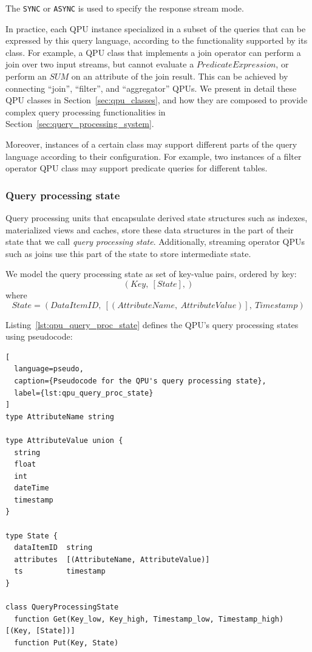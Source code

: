 The \texttt{SYNC} or \texttt{ASYNC} is used to specify the response stream mode.

In practice, each QPU instance specialized in a subset of the queries that can be expressed by this query language,
according to the functionality supported by its class.
For example, a QPU class that implements a join operator can perform a join over two input streams,
but cannot evaluate a $PredicateExpression$, or perform an $SUM$ on an attribute of the join result.
This can be achieved by connecting ``join'', ``filter'', and ``aggregator'' QPUs.
We present in detail these QPU classes in Section~\ref{sec:qpu_classes},
and how they are composed to provide complex query processing functionalities in Section~\ref{sec:query_processing_system}.

Moreover, instances of a certain class may support different parts of the query language according to their
configuration.
For example, two instances of a filter operator QPU class may support predicate queries for different tables.

\subsubsection{Query processing state}

Query processing units that encapsulate derived state structures such as indexes, materialized views and
caches, store these data structures in the part of their state that we call \textit{query processing state}.
Additionally, streaming operator QPUs such as joins use this part of the state to store intermediate state.

We model the query processing state as set of key-value pairs, ordered by key:
\[
  (Key,~[State],)
\]
where
\[
  State = (DataItemID,~[(AttributeName,~AttributeValue)],~Timestamp)
\]


Listing~\ref{lst:qpu_query_proc_state} defines the QPU's query processing states using pseudocode:

\begin{lstlisting}[
  language=pseudo,
  caption={Pseudocode for the QPU's query processing state},
  label={lst:qpu_query_proc_state}
]
type AttributeName string

type AttributeValue union {
  string
  float
  int
  dateTime
  timestamp
}

type State {
  dataItemID  string
  attributes  [(AttributeName, AttributeValue)]
  ts          timestamp
}

class QueryProcessingState
  function Get(Key_low, Key_high, Timestamp_low, Timestamp_high) [(Key, [State])]
  function Put(Key, State)
\end{lstlisting}

